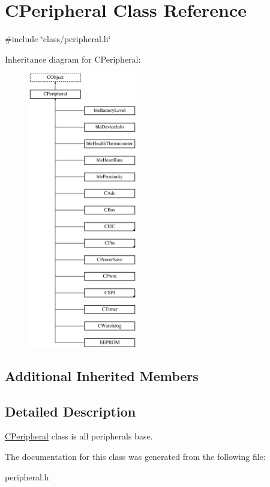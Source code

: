 \hypertarget{class_c_peripheral}{\section{C\-Peripheral Class Reference}
\label{class_c_peripheral}
}


{\ttfamily \#include \char`\"{}class/peripheral.\-h\char`\"{}}

Inheritance diagram for C\-Peripheral\-:\begin{figure}[H]
\begin{center}
\leavevmode
\includegraphics[height=12.000000cm]{d9/db6/class_c_peripheral}
\end{center}
\end{figure}
\subsection*{Additional Inherited Members}


\subsection{Detailed Description}
\hyperlink{class_c_peripheral}{C\-Peripheral} class is all peripherals base. 

The documentation for this class was generated from the following file\-:\begin{DoxyCompactItemize}
\item 
peripheral.\-h\end{DoxyCompactItemize}
